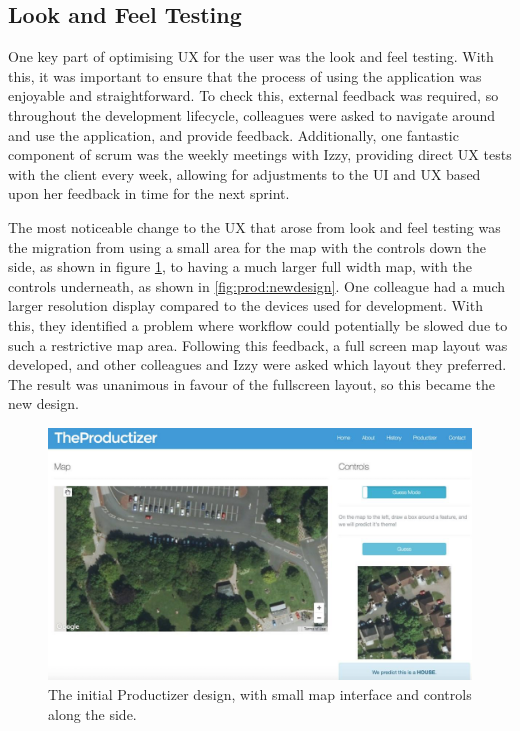 \subsection{Look and Feel Testing}

One key part of optimising UX for the user was the look and feel testing. With this, it was important to ensure that the process of using the application was enjoyable and straightforward. To check this, external feedback was required, so throughout the development lifecycle, colleagues were asked to navigate around and use the application, and provide feedback. Additionally, one fantastic component of scrum was the weekly meetings with Izzy, providing direct UX tests with the client every week, allowing for adjustments to the UI and UX based upon her feedback in time for the next sprint.

The most noticeable change to the UX that arose from look and feel testing was the migration from using a small area for the map with the controls down the side, as shown in figure \ref{fig:prod:olddesign}, to having a much larger full width map, with the controls underneath, as shown in \ref{fig:prod:newdesign}. One colleague had a much larger resolution display compared to the devices used for development. With this, they identified a problem where workflow could potentially be slowed due to such a restrictive map area. Following this feedback, a full screen map layout was developed, and other colleagues and Izzy were asked which layout they preferred. The result was unanimous in favour of the fullscreen layout, so this became the new design.


\begin{figure}[H]
    \centering
    \includegraphics[width=\textwidth]{figs/6/6-testing-olddesign}
    \caption{The initial Productizer design, with small map interface and controls along the side.}
    \label{fig:prod:olddesign}
\end{figure}

